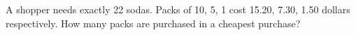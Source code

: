 A shopper needs exactly 22 sodas. Packs of 10, 5, 1 cost 15.20, 7.30, 1.50 dollars respectively. How many packs are purchased in a cheapest purchase?

